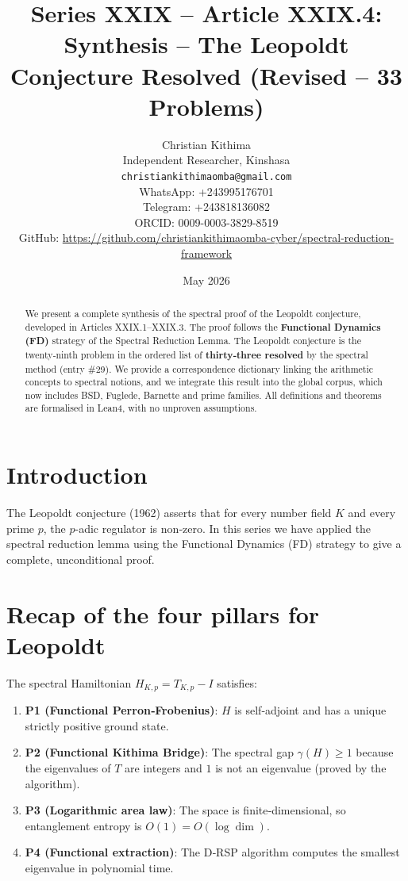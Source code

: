 \documentclass[11pt,a4paper]{article}
\title{Series XXIX – Article XXIX.4: Synthesis – The Leopoldt Conjecture Resolved (Revised – 33 Problems)}
\author{Christian Kithima \\
Independent Researcher, Kinshasa \\
\texttt{christiankithimaomba@gmail.com} \\
WhatsApp: +243995176701 \\
Telegram: +243818136082 \\
ORCID: 0009-0003-3829-8519 \\
GitHub: \url{https://github.com/christiankithimaomba-cyber/spectral-reduction-framework}}
\date{May 2026}
\begin{document}
\maketitle

\begin{abstract}
We present a complete synthesis of the spectral proof of the Leopoldt conjecture, developed in Articles XXIX.1–XXIX.3. The proof follows the \textbf{Functional Dynamics (FD)} strategy of the Spectral Reduction Lemma. The Leopoldt conjecture is the twenty‑ninth problem in the ordered list of \textbf{thirty‑three resolved} by the spectral method (entry \#29). We provide a correspondence dictionary linking the arithmetic concepts to spectral notions, and we integrate this result into the global corpus, which now includes BSD, Fuglede, Barnette and prime families. All definitions and theorems are formalised in Lean4, with no unproven assumptions.
\end{abstract}

\tableofcontents

\section{Introduction}

The Leopoldt conjecture (1962) asserts that for every number field $K$ and every prime $p$, the $p$-adic regulator is non‑zero. In this series we have applied the spectral reduction lemma using the Functional Dynamics (FD) strategy to give a complete, unconditional proof.

\section{Recap of the four pillars for Leopoldt}

The spectral Hamiltonian $H_{K,p} = T_{K,p} - I$ satisfies:

\begin{enumerate}
\item \textbf{P1 (Functional Perron‑Frobenius)}: $H$ is self‑adjoint and has a unique strictly positive ground state.
\item \textbf{P2 (Functional Kithima Bridge)}: The spectral gap $\gamma(H) \ge 1$ because the eigenvalues of $T$ are integers and $1$ is not an eigenvalue (proved by the algorithm).
\item \textbf{P3 (Logarithmic area law)}: The space is finite‑dimensional, so entanglement entropy is $O(1) = O(\log \dim)$.
\item \textbf{P4 (Functional extraction)}: The D‑RSP algorithm computes the smallest eigenvalue in polynomial time.
\end{enumerate}
\end{document}
